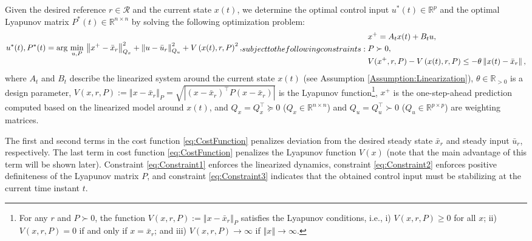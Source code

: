 \documentclass[1p,times]{elsarticle}
\begin{document}
Given the desired reference $r\in\mathcal{R}$ and the current state $x(t)$, we determine the optimal control input $u^\ast(t)\in\mathbb{R}^p$ and the optimal Lyapunov matrix $P^\ast(t)\in\mathbb{R}^{n\times n}$ by solving the following optimization problem:
\begin{subequations}\label{eq:OptimizationProblemMain}{{\color{blue}}
\begin{align}\label{eq:CostFunction}
u^\ast(t),P^\ast(t)=\arg\,\min_{u,P}\,\left\Vert x^+-\bar{x}_r\right\Vert^2_{Q_x}+\left\Vert u-\bar{u}_r\right\Vert^2_{Q_u}
+V\left(x(t),r,P\right)^2,
\end{align}}
subject to the following constraints:
\begin{align}
& x^+=A_tx(t)+B_tu,\label{eq:Constraint1}\\
& P\succ0,\label{eq:Constraint2}\\
& V(x^+,r,P)-V\left(x(t),r,P\right)\leq-\theta\left\Vert x(t)-\bar{x}_r\right\Vert,\label{eq:Constraint3}
\end{align}
\end{subequations}
where $A_t$ and $B_t$ describe the linearized system around the current state $x(t)$ (see Assumption \ref{Assumption:Linearization}), $\theta\in\mathbb{R}_{>0}$ is a design parameter, $V(x,r,P):=\left\Vert x-\bar{x}_r\right\Vert_{P}=\sqrt{\left\vert(x-\bar{x}_r)^\top P(x-\bar{x}_r)\right\vert}$ is the Lyapunov function\footnote{For any $r$ and $P\succ0$, the function $V(x,r,P):=\left\Vert x-\bar{x}_r\right\Vert_{P}$ satisfies the Lyapunov conditions, i.e., i) $V(x,r,P)\geq0$ for all $x$; ii) $V(x,r,P)=0$ if and only if $x=\bar{x}_r$; and iii) $V(x,r,P)\rightarrow\infty$ if $\left\Vert x\right\Vert\rightarrow\infty$.}, $x^+$ is the one-step-ahead prediction computed based on the linearized model around $x(t)$, and $Q_x=Q_x^{\top} \succeq 0$ ($Q_x \in \mathbb{R}^{n \times n}$) and $Q_u=Q_u^{\top} \succ 0$ ($Q_u \in \mathbb{R}^{p \times p}$) are weighting matrices. 


The first and second terms in the cost function \eqref{eq:CostFunction} penalizes deviation from the desired steady state $\bar{x}_r$ and steady input $\bar{u}_r$, respectively. The last term in cost function \eqref{eq:CostFunction} penalizes the Lyapunov function $V(x)$ (note that the main advantage of this term will be shown later). Constraint \eqref{eq:Constraint1} enforces the linearized dynamics, constraint \eqref{eq:Constraint2} enforces positive definiteness of the Lyapunov matrix $P$, and constraint \eqref{eq:Constraint3} indicates that the obtained control input must be stabilizing at the current time instant $t$. 
\end{document}
